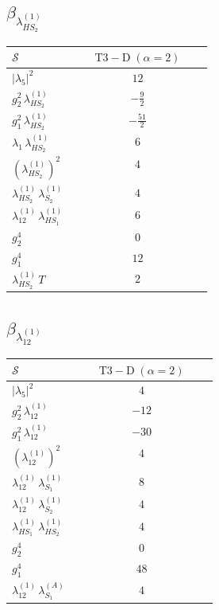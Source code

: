 \documentclass[9pt]{article}
\begin{document}
\subsection*{$ \beta_{\lambda_{HS_2}^{(1)}} $}
\begin{longtable}{@{}p{0.31\linewidth}c@{}}
\toprule
$\mathcal{S}$ & $ \mathrm{T3-D}\;(\alpha=2) $ \\
\midrule
$ |\lambda_5|^2 $ & $ 12 $ \\
$ g_2^2\,\lambda_{HS_2}^{(1)} $ & $ - \frac{9}{2} $ \\
$ g_1^2\,\lambda_{HS_2}^{(1)} $ & $ - \frac{51}{2} $ \\
$ \lambda_1\,\lambda_{HS_2}^{(1)} $ & $ 6 $ \\
$ \left(\lambda_{HS_2}^{(1)}\right)^2 $ & $ 4 $ \\
$ \lambda_{HS_2}^{(1)}\,\lambda_{S_2}^{(1)} $ & $ 4 $ \\
$ \lambda_{12}^{(1)}\,\lambda_{HS_1}^{(1)} $ & $ 6 $ \\
$ g_2^4 $ & $ 0 $ \\
$ g_1^4 $ & $ 12 $ \\
$ \lambda_{HS_2}^{(1)}\,T $ & $ 2 $ \\
\bottomrule
\end{longtable}
\subsection*{$ \beta_{\lambda_{12}^{(1)}} $}
\begin{longtable}{@{}p{0.31\linewidth}c@{}}
\toprule
$\mathcal{S}$ & $ \mathrm{T3-D}\;(\alpha=2) $ \\
\midrule
$ |\lambda_5|^2 $ & $ 4 $ \\
$ g_2^2\,\lambda_{12}^{(1)} $ & $ -12 $ \\
$ g_1^2\,\lambda_{12}^{(1)} $ & $ -30 $ \\
$ \left(\lambda_{12}^{(1)}\right)^2 $ & $ 4 $ \\
$ \lambda_{12}^{(1)}\,\lambda_{S_1}^{(1)} $ & $ 8 $ \\
$ \lambda_{12}^{(1)}\,\lambda_{S_2}^{(1)} $ & $ 4 $ \\
$ \lambda_{HS_1}^{(1)}\,\lambda_{HS_2}^{(1)} $ & $ 4 $ \\
$ g_2^4 $ & $ 0 $ \\
$ g_1^4 $ & $ 48 $ \\
$ \lambda_{12}^{(1)}\,\lambda_{S_1}^{(A)} $ & $ 4 $ \\
\bottomrule
\end{longtable}
\end{document}
